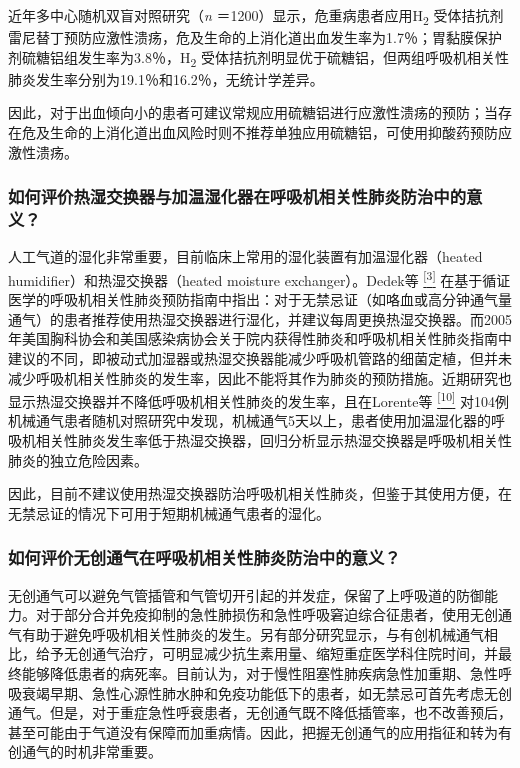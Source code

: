 近年多中心随机双盲对照研究（\emph{n}
＝1200）显示，危重病患者应用H\textsubscript{2}
受体拮抗剂雷尼替丁预防应激性溃疡，危及生命的上消化道出血发生率为1.7％；胃黏膜保护剂硫糖铝组发生率为3.8％，H\textsubscript{2}
受体拮抗剂明显优于硫糖铝，但两组呼吸机相关性肺炎发生率分别为19.1％和16.2％，无统计学差异。

因此，对于出血倾向小的患者可建议常规应用硫糖铝进行应激性溃疡的预防；当存在危及生命的上消化道出血风险时则不推荐单独应用硫糖铝，可使用抑酸药预防应激性溃疡。

\subsubsection{如何评价热湿交换器与加温湿化器在呼吸机相关性肺炎防治中的意义？}

人工气道的湿化非常重要，目前临床上常用的湿化装置有加温湿化器（heated
humidifier）和热湿交换器（heated moisture exchanger）。Dedek等
\protect\hyperlink{text00014.htmlux5cux23ch3-13}{\textsuperscript{{[}3{]}}}
在基于循证医学的呼吸机相关性肺炎预防指南中指出：对于无禁忌证（如咯血或高分钟通气量通气）的患者推荐使用热湿交换器进行湿化，并建议每周更换热湿交换器。而2005年美国胸科协会和美国感染病协会关于院内获得性肺炎和呼吸机相关性肺炎指南中建议的不同，即被动式加湿器或热湿交换器能减少呼吸机管路的细菌定植，但并未减少呼吸机相关性肺炎的发生率，因此不能将其作为肺炎的预防措施。近期研究也显示热湿交换器并不降低呼吸机相关性肺炎的发生率，且在Lorente等
\protect\hyperlink{text00014.htmlux5cux23ch10-13}{\textsuperscript{{[}10{]}}}
对104例机械通气患者随机对照研究中发现，机械通气5天以上，患者使用加温湿化器的呼吸机相关性肺炎发生率低于热湿交换器，回归分析显示热湿交换器是呼吸机相关性肺炎的独立危险因素。

因此，目前不建议使用热湿交换器防治呼吸机相关性肺炎，但鉴于其使用方便，在无禁忌证的情况下可用于短期机械通气患者的湿化。

\subsubsection{如何评价无创通气在呼吸机相关性肺炎防治中的意义？}

无创通气可以避免气管插管和气管切开引起的并发症，保留了上呼吸道的防御能力。对于部分合并免疫抑制的急性肺损伤和急性呼吸窘迫综合征患者，使用无创通气有助于避免呼吸机相关性肺炎的发生。另有部分研究显示，与有创机械通气相比，给予无创通气治疗，可明显减少抗生素用量、缩短重症医学科住院时间，并最终能够降低患者的病死率。目前认为，对于慢性阻塞性肺疾病急性加重期、急性呼吸衰竭早期、急性心源性肺水肿和免疫功能低下的患者，如无禁忌可首先考虑无创通气。但是，对于重症急性呼衰患者，无创通气既不降低插管率，也不改善预后，甚至可能由于气道没有保障而加重病情。因此，把握无创通气的应用指征和转为有创通气的时机非常重要。

